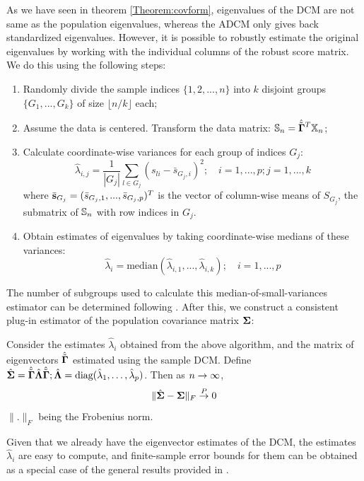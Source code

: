 As we have seen in theorem \ref{Theorem:covform}, eigenvalues of the DCM are not same as the population eigenvalues, whereas the ADCM only gives back standardized eigenvalues. However, it is possible to robustly estimate the original eigenvalues by working with the individual columns of the robust score matrix. We do this using the following steps:

\begin{enumerate}
\item Randomly divide the sample indices $\{1,2,...,n\}$ into $k$ disjoint groups $\{G_1,...,G_k \}$ of size $\lfloor n/k \rfloor$ each;

\item Assume the data is centered. Transform the data matrix: ${\mathbb{S}}_n = \hat{ \tilde{{\boldsymbol{\Gamma}}}}^T {\mathbb{X}}_n$;

\item Calculate coordinate-wise variances for each group of indices $G_j$:
%
$$
\hat\lambda_{i,j} = \frac{1}{|G_j|} \sum_{l \in G_j} (s_{li} - \bar s_{G_j,i})^2; \quad i = 1,...,p; j = 1,...,k
$$
where $\bar{{\bf{s}}}_{G_j} = (\bar s_{G_j,1}, ..., \bar s_{G_j,p})^T$ is the vector of column-wise means of $S_{G_j}$, the submatrix of ${\mathbb{S}}_n$ with row indices in $G_j$.
%
\item Obtain estimates of eigenvalues by taking coordinate-wise medians of these variances:
%
$$
\hat \lambda_i = \text{median} (\hat\lambda_{i,1}, ... , \hat\lambda_{i,k} ); \quad i = 1,...,p
$$
%
\end{enumerate}
%
The number of subgroups used to calculate this median-of-small-variances estimator can be determined following \cite{Minsker15}. After this, we construct a consistent plug-in estimator of the population covariance matrix ${\boldsymbol{\Sigma}}$:

\begin{Theorem}\label{Thm:pluginSigma}
Consider the estimates $\hat\lambda_i$ obtained from the above algorithm, and the matrix of eigenvectors $\hat{ \tilde{{\boldsymbol{\Gamma}}} }$ estimated using the sample DCM. Define $\hat{{\boldsymbol{\Sigma}}} = \hat{ \tilde{{\boldsymbol{\Gamma}}} } \hat{{\boldsymbol{\Lambda}}} \hat{ \tilde{{\boldsymbol{\Gamma}}} }; \hat{{\boldsymbol{\Lambda}}} = \text{diag}(\hat\lambda_1, \ldots, \hat\lambda_p)$. Then as $n \rightarrow \infty$,
%
$$ \| \hat{{\boldsymbol{\Sigma}}} - {\boldsymbol{\Sigma}} \|_F \stackrel{P}{\rightarrow} 0 $$
%
$\|.\|_F$ being the Frobenius norm.
\end{Theorem}

Given that we already have the eigenvector estimates of the DCM, the estimates $\hat \lambda_i$ are easy to compute, and finite-sample error bounds for them can be obtained as a special case of the general results provided in \cite{Minsker15}.